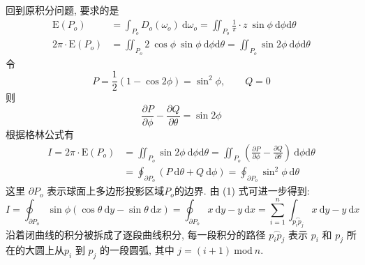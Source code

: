 回到原积分问题, 要求的是 
\begin{align*}
\mathrm{E}(P_o) &= \int_{P_o}{D_o(\omega_o)}\ \mathrm{d}\omega_o = \iint_{P_o}{\frac{1}{\pi}\cdot z\ \sin\phi\ \mathrm{d}\phi\mathrm{d}\theta}\\
2\pi\cdot\mathrm{E}(P_o) &= \iint_{P_o}2\ \cos\phi\ \sin\phi\ \mathrm{d}\phi\mathrm{d}\theta = \iint_{P_o}\sin{2\phi}\ \mathrm{d}\phi\mathrm{d}\theta
\end{align*}
令 
\[
P = \frac{1}{2}(1-\cos{2\phi}) = \sin^2\phi, \qquad Q = 0
\]
则
\[
\frac{\partial P}{\partial\phi} - \frac{\partial Q}{\partial\theta} = \sin{2\phi}
\]
根据格林公式有
\begin{align*}
I = 2\pi\cdot\mathrm{E}(P_o) &= \iint_{P_o}\sin{2\phi}\ \mathrm{d}\phi\mathrm{d}\theta = \iint_{P_o}\left(\frac{\partial P}{\partial\phi} - \frac{\partial Q}{\partial\theta}\right)\ \mathrm{d}\phi\mathrm{d}\theta \\
&= \oint_{\partial P_o} \left(P\ \mathrm{d}\theta + Q\ \mathrm{d}\phi \right) = \oint_{\partial P_o} {\sin^2\phi}\ \mathrm{d}\theta
\end{align*}
这里 $\partial P_o$ 表示球面上多边形投影区域$P_o$的边界. 由 (1) 式可进一步得到:
\[
I = \oint_{\partial P_o}\sin\phi(\cos\theta\ \mathrm{d}y - \sin\theta\ \mathrm{d}x) = \oint_{\partial P_o}x\ \mathrm{d}y - y\ \mathrm{d}x = \sum_{i=1}^{n}\int_{\overset{\frown}{p_ip_j}} x\ \mathrm{d}y - y\ \mathrm{d}x
\]
沿着闭曲线的积分被拆成了逐段曲线积分, 每一段积分的路径 $\overset{\frown}{p_ip_j}$ 表示 $p_i$ 和 $p_j$ 所在的大圆上从$p_i$ 到 $p_j$ 的一段圆弧, 其中 $j = (i+1)\ \mathrm{mod}\ n$.

